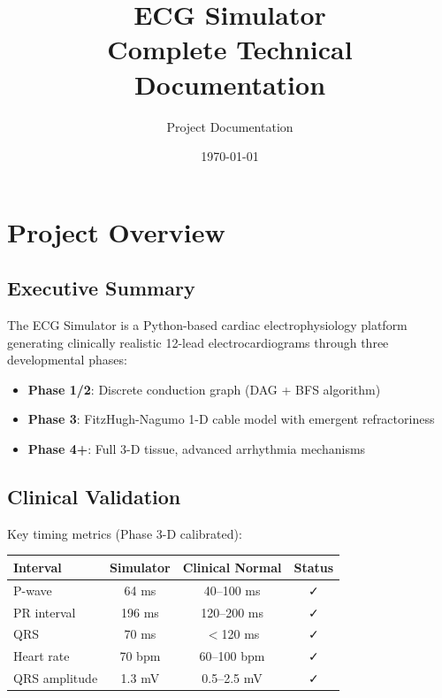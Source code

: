 \documentclass[12pt]{book}
\title{\textbf{ECG Simulator}\\Complete Technical Documentation}
\author{Project Documentation}
\date{\today}
\begin{document}
\maketitle
\tableofcontents
\newpage


\chapter{Project Overview}

\section{Executive Summary}

The ECG Simulator is a Python-based cardiac electrophysiology platform generating clinically realistic 12-lead electrocardiograms through three developmental phases:

\begin{itemize}
  \item \textbf{Phase 1/2}: Discrete conduction graph (DAG + BFS algorithm)
  \item \textbf{Phase 3}: FitzHugh-Nagumo 1-D cable model with emergent refractoriness
  \item \textbf{Phase 4+}: Full 3-D tissue, advanced arrhythmia mechanisms
\end{itemize}

\section{Clinical Validation}

Key timing metrics (Phase 3-D calibrated):

\begin{tabular}{|l|c|c|c|}
\hline
\textbf{Interval} & \textbf{Simulator} & \textbf{Clinical Normal} & \textbf{Status} \\
\hline
P-wave & 64 ms & 40--100 ms & ✓ \\
PR interval & 196 ms & 120--200 ms & ✓ \\
QRS & 70 ms & $<$120 ms & ✓ \\
Heart rate & 70 bpm & 60--100 bpm & ✓ \\
QRS amplitude & 1.3 mV & 0.5--2.5 mV & ✓ \\
\hline
\end{tabular}
\end{document}
